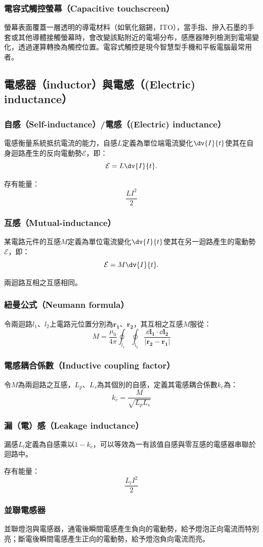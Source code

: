 \documentclass[a4paper,12pt]{report}
\begin{document}
\begin{itemize}
\subsubsection{電容式觸控螢幕（Capacitive touchscreen）}
螢幕表面覆蓋一層透明的導電材料（如氧化銦錫，ITO），當手指、摻入石墨的手套或其他導體接觸螢幕時，會改變該點附近的電場分布，感應器陣列檢測到電場變化，透過運算轉換為觸控位置。電容式觸控是現今智慧型手機和平板電腦最常用者。
\subsection{電感器（inductor）與電感（(Electric) inductance）}
\subsubsection{自感（Self-inductance）/電感（(Electric) inductance）}
電感衡量系統抵抗電流的能力，自感$L$定義為單位端電流變化$\dv{I}{t}$使其在自身迴路產生的反向電動勢$\mathcal{E}$，即：
\[\mathcal{E}=L\dv{I}{t}.\]

存有能量：
\[\frac{LI^2}{2}\]
\subsubsection{互感（Mutual-inductance）}
某電路元件的互感$M$定義為單位電流變化$\dv{I}{t}$使其在另一迴路產生的電動勢$\mathcal{E}$，即：
\[\mathcal{E}=M\dv{I}{t}.\]

兩迴路互相之互感相同。
\subsubsection{紐曼公式（Neumann formula）}
令兩迴路$l_1$、$l_2$上電路元位置分別為$\mathbf{r_1}$、$\mathbf{r_2}$，其互相之互感$M$服從：
\[M=\frac{\mu_0}{4\pi}\oint_{l_1}\oint_{l_2}\frac{\dd\mathbf{l_1}\cdot\dd\mathbf{l_2}}{|\mathbf{r_2}-\mathbf{r_1}|}\]
\subsubsection{電感耦合係數（Inductive coupling factor）}
令$M$為兩迴路之互感，$L_p$、$L_s$為其個別的自感，定義其電感耦合係數$k_c$為：
\[k_c=\frac{M}{\sqrt{L_pL_s}}\]
\subsubsection{漏（電）感（Leakage inductance）}
漏感$L_l$定義為自感乘以$1-k_c$，可以等效為一有該值自感與零互感的電感器串聯於迴路中。

存有能量：
\[\frac{L_lI^2}{2}\]
\subsubsection{並聯電感器}
並聯燈泡與電感器，通電後瞬間電感產生負向的電動勢，給予燈泡正向電流而特別亮；斷電後瞬間電感產生正向的電動勢，給予燈泡負向電流而亮。

\end{itemize}
\end{document}
